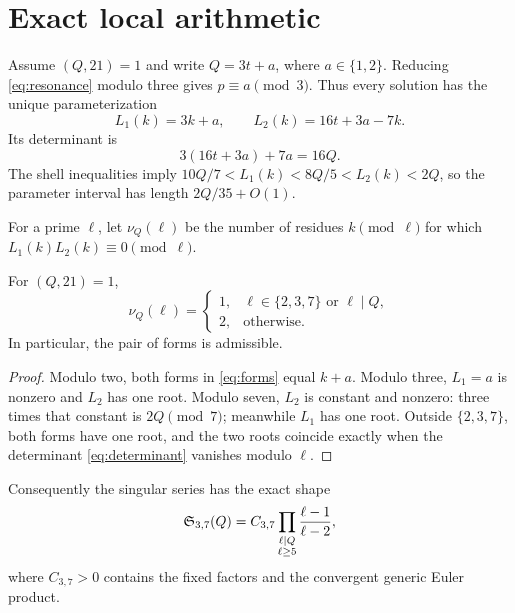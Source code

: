 \section{Exact local arithmetic}

Assume $(Q,21)=1$ and write $Q=3t+a$, where $a\in\{1,2\}$.  Reducing
\eqref{eq:resonance} modulo three gives $p\equiv a\pmod 3$.  Thus every solution has
the unique parameterization
\begin{equation}
 L_1(k)=3k+a,\qquad L_2(k)=16t+3a-7k.               \label{eq:forms}
\end{equation}
Its determinant is
\begin{equation}
 3(16t+3a)+7a=16Q.                                  \label{eq:determinant}
\end{equation}
The shell inequalities imply
$10Q/7<L_1(k)<8Q/5<L_2(k)<2Q$, so the parameter interval has length
$2Q/35+O(1)$.

For a prime $\ell$, let $\nu_Q(\ell)$ be the number of residues $k\pmod\ell$ for
which $L_1(k)L_2(k)\equiv0\pmod\ell$.

\begin{lemma}\label{lem:roots}
For $(Q,21)=1$,
\[
 \nu_Q(\ell)=
 \begin{cases}
 1,&\ell\in\{2,3,7\}\text{ or }\ell\mid Q,\\
 2,&\text{otherwise}.
 \end{cases}
\]
In particular, the pair of forms is admissible.
\end{lemma}

\begin{proof}
Modulo two, both forms in \eqref{eq:forms} equal $k+a$.  Modulo three, $L_1=a$
is nonzero and $L_2$ has one root.  Modulo seven, $L_2$ is constant and nonzero:
three times that constant is $2Q\pmod7$; meanwhile $L_1$ has one root.  Outside
$\{2,3,7\}$, both forms have one root, and the two roots coincide exactly when the
determinant \eqref{eq:determinant} vanishes modulo $\ell$.
\end{proof}

Consequently the singular series has the exact shape
\begin{equation}
 \mathfrak S_{3,7}(Q)=C_{3,7}
 \prod_{\substack{\ell\mid Q\\ \ell\ge5}}
 \frac{\ell-1}{\ell-2},                              \label{eq:series}
\end{equation}
where $C_{3,7}>0$ contains the fixed factors and the convergent generic Euler
product.
